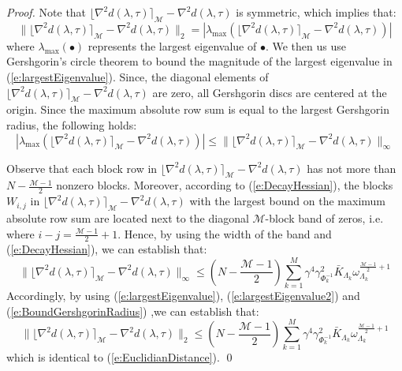 \begin{proof}
Note that $\lfloor \nabla^2 d(\lambda, \tau) \rceil_{\mathcal{M}} - \nabla^2 d(\lambda, \tau)$ is symmetric, which implies that:
\begin{equation} \label{e:largestEigenvalue}
\| \lfloor \nabla^2 d(\lambda, \tau) \rceil_{\mathcal{M}} - \nabla^2 d(\lambda, \tau) \|_2 = | \lambda_{\max} ( \lfloor \nabla^2 d(\lambda, \tau) \rceil_{\mathcal{M}} - \nabla^2 d(\lambda, \tau) ) |
\end{equation}
where $\lambda_{\max}(\bullet)$ represents the largest eigenvalue of $\bullet$. We then us use Gershgorin's circle theorem to bound the magnitude of the largest eigenvalue in (\ref{e:largestEigenvalue}). Since, the diagonal elements of $\lfloor \nabla^2 d(\lambda, \tau) \rceil_{\mathcal{M}} - \nabla^2 d(\lambda, \tau)$ are zero, all Gershgorin discs are centered at the origin. Since the maximum absolute row sum is equal to the largest Gershgorin radius, the following holds:
\begin{equation} \label{e:largestEigenvalue2}
| \lambda_{\max} ( \lfloor \nabla^2 d(\lambda, \tau) \rceil_{\mathcal{M}} - \nabla^2 d(\lambda, \tau) ) | \leq \| \lfloor \nabla^2 d(\lambda, \tau) \rceil_{\mathcal{M}} - \nabla^2 d(\lambda, \tau) \|_{\infty}
\end{equation}

Observe that each block row in $ \lfloor \nabla^2 d(\lambda, \tau) \rceil_{\mathcal{M}} - \nabla^2 d(\lambda, \tau)$ has not more than $N -\frac{\mathcal{M} - 1}{2}$ nonzero blocks. Moreover, according to (\ref{e:DecayHessian}), the blocks $W_{i,j}$ in $\lfloor \nabla^2 d(\lambda, \tau) \rceil_{\mathcal{M}} - \nabla^2 d(\lambda, \tau)$ with the largest bound on the maximum absolute row sum are located next to the diagonal $\mathcal{M}$-block band of zeros, i.e. where $i - j = \frac{\mathcal{M} - 1}{2} + 1$. Hence, by using the width of the band and (\ref{e:DecayHessian}), we can establish that:
\begin{equation} \label{e:BoundGershgorinRadius}
\| \lfloor \nabla^2 d(\lambda, \tau) \rceil_{\mathcal{M}} - \nabla^2 d(\lambda, \tau) \|_{\infty} \leq \left( N -\frac{\mathcal{M} - 1}{2} \right) \sum_{k=1}^M \gamma^4 \gamma_{\Phi_k^{-1}}^2 \bar{K}_{\Lambda_k} \omega_{\Lambda_k}^{\frac{\mathcal{M} - 1}{2} + 1}
\end{equation}
Accordingly, by using (\ref{e:largestEigenvalue}), (\ref{e:largestEigenvalue2}) and (\ref{e:BoundGershgorinRadius}) ,we can establish that:
\begin{equation} 
\| \lfloor \nabla^2 d(\lambda, \tau) \rceil_{\mathcal{M}} - \nabla^2 d(\lambda, \tau) \|_2 \leq \left( N -\frac{\mathcal{M} - 1}{2} \right) \sum_{k=1}^M \gamma^4 \gamma_{\Phi_k^{-1}}^2 \bar{K}_{\Lambda_k} \omega_{\Lambda_k}^{\frac{\mathcal{M} - 1}{2} + 1}
\end{equation}
which is identical to (\ref{e:EuclidianDistance}).
\qed
\end{proof}

